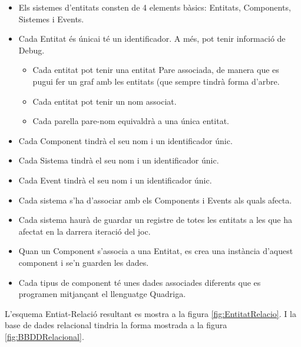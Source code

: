 \begin{itemize}
  \item Els sistemes d'entitats consten de 4 elements bàsics: Entitats, Components, Sistemes i Events.
  
  \item Cada Entitat és únicai té un identificador. A més, pot tenir informació de Debug.
    \begin{itemize}
      \item Cada entitat pot tenir una entitat Pare associada, de manera que es pugui fer un graf amb les entitats (que sempre tindrà forma d'arbre.
      \item Cada entitat pot tenir un nom associat.
      \item Cada parella pare-nom equivaldrà a una única entitat.
    \end{itemize}
  \item Cada Component tindrà el seu nom i un identificador únic.
  
  \item Cada Sistema tindrà el seu nom i un identificador únic.
  
  \item Cada Event tindrà el seu nom i un identificador únic.
  
  \item Cada sistema s'ha d'associar amb els Components i Events als quals afecta.
  
  \item Cada sistema haurà de guardar un registre de totes les entitats a les que ha afectat en la darrera iteració del joc.
  
  \item Quan un Component s'associa a una Entitat, es crea una instància d'aquest component i se'n guarden les dades.
  
  \item Cada tipus de component té unes dades associades diferents que es programen mitjançant el llenguatge Quadriga.
\end{itemize}

L'esquema Entiat-Relació resultant es mostra a la figura \ref{fig:EntitatRelacio}. I la base de dades relacional tindria la forma mostrada a la figura \ref{fig:BBDDRelacional}.

